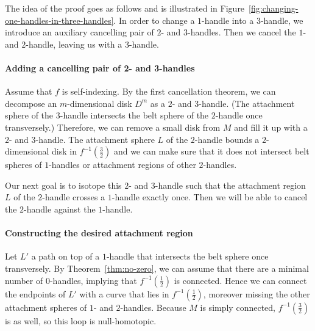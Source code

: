 \begin{myproof}
    The idea of the proof goes as follows and is illustrated in Figure~\ref{fig:changing-one-handles-in-three-handles}.
    In order to change a $1$-handle into a $3$-handle, we introduce an auxiliary cancelling pair of $2$- and $3$-handles.
    Then we cancel the $1$- and $2$-handle, leaving us with a $3$-handle.
    \paragraph{Adding a cancelling pair of 2- and 3-handles}
    Assume that $f$ is self-indexing.
    By the first cancellation theorem, we can decompose an $m$-dimensional disk $D^{m}$ as a $2$- and  $3$-handle. (The attachment sphere of the $3$-handle intersects the belt sphere of the $2$-handle once transversely.)
    Therefore, we can remove a small disk from $M$ and fill it up with a $2$- and $3$-handle.
    The attachment sphere $L$ of the $2$-handle bounds a $2$-dimensional disk in $f^{-1}(\frac{3}{2})$ and we can make sure that it does not intersect belt spheres of $1$-handles or attachment regions of other $2$-handles.

    Our next goal is to isotope this $2$- and $3$-handle such that the attachment region $L$ of the $2$-handle crosses a $1$-handle exactly once. Then we will be able to cancel the $2$-handle against the $1$-handle.

    \paragraph{Constructing the desired attachment region}
    Let $L'$ a path on top of a $1$-handle that intersects the belt sphere once transversely.
    By Theorem~\ref{thm:no-zero}, we can assume that there are a minimal number of $0$-handles, implying that $f^{-1}(\frac{1}{2})$ is connected.
    Hence we can connect the endpoints of $L'$ with a curve that lies in $f^{-1}(\frac{1}{2})$,
    moreover missing the other attachment spheres of $1$- and $2$-handles.
    Because $M$ is simply connected, $f^{-1}(\frac{3}{2})$ is as well, so this loop is null-homotopic.

\end{myproof}
